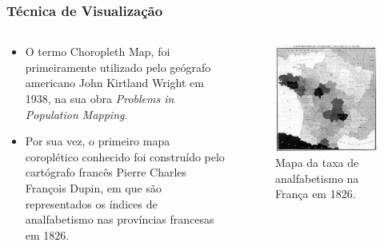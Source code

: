 \documentclass[aspectratio=169]{beamer}
\begin{document}
\begin{frame}
\frametitle{Técnica de Visualização}
\justifying

\begin{columns}

\begin{column}{0.5\textwidth}

\begin{itemize}

\item O termo Choropleth Map, foi primeiramente utilizado pelo geógrafo americano John Kirtland Wright em 1938, na sua obra \textit{Problems in Population Mapping}.

\item Por sua vez, o primeiro mapa coroplético conhecido foi construído pelo cartógrafo francês Pierre Charles François Dupin, em que são representados os índices de analfabetismo nas províncias francesas em 1826.

\end{itemize}

\end{column}

\begin{column}{0.5\textwidth}

\begin{figure}
\centering
\includegraphics[width=.6\textwidth]{images/analfabetismo-franca.jpg}
\caption{Mapa da taxa de analfabetismo na França em 1826.}
\end{figure}


\end{column}
\end{columns}


\end{frame}
\end{document}
